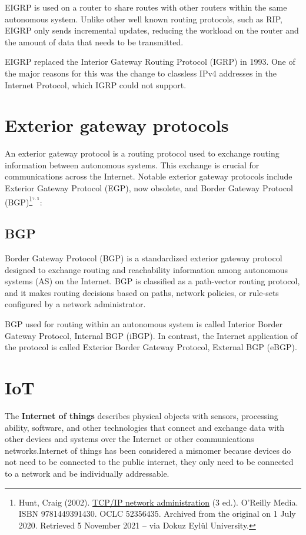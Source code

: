 \documentclass[a4paper,12pt]{book}
\begin{document}
EIGRP is used on a router to share routes with other routers within the same autonomous system. Unlike other well known routing protocols, such as RIP, EIGRP only sends incremental updates, reducing the workload on the router and the amount of data that needs to be transmitted.

EIGRP replaced the Interior Gateway Routing Protocol (IGRP) in 1993. One of the major reasons for this was the change to classless IPv4 addresses in the Internet Protocol, which IGRP could not support.

\section{Exterior gateway protocols}

An exterior gateway protocol is a routing protocol used to exchange routing information between autonomous systems. This exchange is crucial for communications across the Internet. Notable exterior gateway protocols include Exterior Gateway Protocol (EGP), now obsolete, and Border Gateway Protocol (BGP)\footnote{\label{EGP}  Hunt, Craig (2002). \href{http://web.deu.edu.tr/doc/oreily/networking/tcpip/index.htm}{TCP/IP network administration} (3 ed.). O'Reilly Media. ISBN 9781449391430. OCLC 52356435. Archived from the original on 1 July 2020. Retrieved 5 November 2021 – via Dokuz Eylül University.}${}^{{}^{7 \cdot 5}}$:  

\subsection{BGP}
Border Gateway Protocol (BGP) is a standardized exterior gateway protocol designed to exchange routing and reachability information among autonomous systems (AS) on the Internet. BGP is classified as a path-vector routing protocol, and it makes routing decisions based on paths, network policies, or rule-sets configured by a network administrator.

BGP used for routing within an autonomous system is called Interior Border Gateway Protocol, Internal BGP (iBGP). In contrast, the Internet application of the protocol is called Exterior Border Gateway Protocol, External BGP (eBGP).

\section{IoT}
The \textbf{Internet of things} describes physical objects with sensors, processing ability, software, and other technologies that connect and exchange data with other devices and systems over the Internet or other communications networks.Internet of things has been considered a misnomer because devices do not need to be connected to the public internet, they only need to be connected to a network and be individually addressable.
\end{document}
